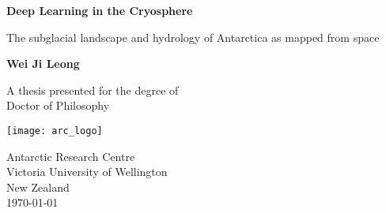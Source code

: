 \begin{titlepage}
  \begin{center}
    \vspace*{1cm}

    \Huge
    \textbf{Deep Learning in the Cryosphere}

    \vspace{0.5cm}
    \LARGE
    The subglacial landscape and hydrology of Antarctica as mapped from space

    \vspace{1.5cm}

    \textbf{Wei Ji Leong}

    \vfill

    A thesis presented for the degree of\\
    Doctor of Philosophy

    \vspace{0.8cm}

    \texttt{[image: arc\_logo]}

    \Large
    Antarctic Research Centre\\
    Victoria University of Wellington\\
    New Zealand\\
    \today

  \end{center}
\end{titlepage}
